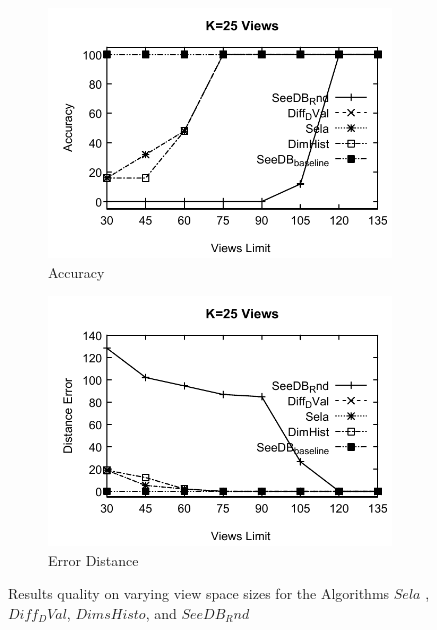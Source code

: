 \begin{figure}[h]
  \centering
  \begin{subfigure}[b]{0.42\textwidth}
    \includegraphics[width=\textwidth]{21.pdf}
    \caption{Accuracy}
        \label{fig:fig1}%
  \end{subfigure}
  \begin{subfigure}[b]{0.42\textwidth}
    \includegraphics[width=\textwidth]{22.pdf}
     \caption{Error Distance}
        \label{fig:figa2}
  \end{subfigure}
  \caption{Results quality on varying view space sizes for the Algorithms $Sela$ ,$Diff_DVal$, $DimsHisto$, and $SeeDB_Rnd$}
\end{figure}

